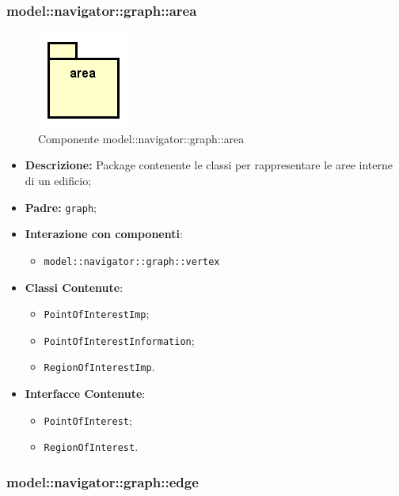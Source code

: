 \documentclass[../DefinizioneDiProdotto.tex]{subfiles}
\begin{document}
\subsubsection{model::\-navigator::\-graph::\-area}

\begin{figure}[H]
	\centering
	\includegraphics[width=\maxwidth]{img/package/area.png}
	\caption{Componente model::\-navigator::\-graph::\-area}\label{fig:model::navigator::graph::area} 
\end{figure}
\begin{itemize}
	\item \textbf{Descrizione:} Package contenente le classi per rappresentare le aree interne di un edificio;
	\item \textbf{Padre:} \texttt{graph};
	\item \textbf{Interazione con componenti}:
	\begin{itemize}
		\item \texttt{model::navigator::graph::vertex}
	\end{itemize}
	\item \textbf{Classi Contenute}:
	\begin{itemize}
		\item \texttt{PointOfInterestImp};
		
		\item \texttt{PointOfInterestInformation};
		
		\item \texttt{RegionOfInterestImp}.
		
	\end{itemize}
	\item \textbf{Interfacce Contenute}:
	\begin{itemize}
		\item \texttt{PointOfInterest};
		
		\item \texttt{RegionOfInterest}.
		
	\end{itemize}
\end{itemize}

\subsubsection{model::\-navigator::\-graph::\-edge}
\end{document}
